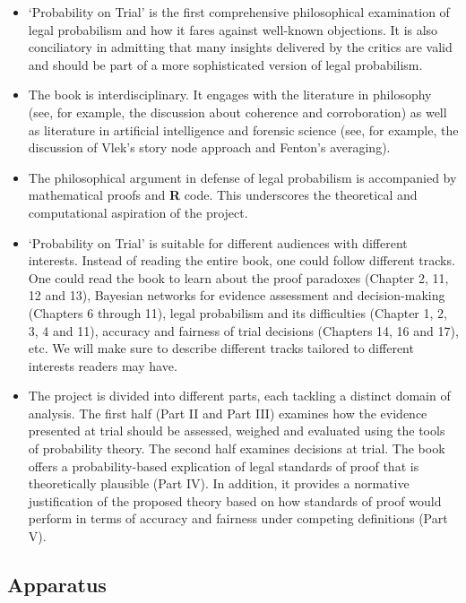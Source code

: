 \documentclass[
  10pt,
  dvipsnames,enabledeprecatedfontcommands]{scrartcl}
\begin{document}
\begin{itemize}
\item
  `Probability on Trial' is the first comprehensive philosophical
  examination of legal probabilism and how it fares against well-known
  objections. It is also conciliatory in admitting that many insights
  delivered by the critics are valid and should be part of a more
  sophisticated version of legal probabilism.
\item
  The book is interdisciplinary. It engages with the literature in
  philosophy (see, for example, the discussion about coherence and
  corroboration) as well as literature in artificial intelligence and
  forensic science (see, for example, the discussion of Vlek's story
  node approach and Fenton's averaging).
\item
  The philosophical argument in defense of legal probabilism is
  accompanied by mathematical proofs and \textbf{\textsf{R}} code. This
  underscores the theoretical and computational aspiration of the
  project.
\item
  `Probability on Trial' is suitable for different audiences with
  different interests. Instead of reading the entire book, one could
  follow different tracks. One could read the book to learn about the
  proof paradoxes (Chapter 2, 11, 12 and 13), Bayesian networks for
  evidence assessment and decision-making (Chapters 6 through 11), legal
  probabilism and its difficulties (Chapter 1, 2, 3, 4 and 11), accuracy
  and fairness of trial decisions (Chapters 14, 16 and 17), etc. We will
  make sure to describe different tracks tailored to different interests
  readers may have.
\item
  The project is divided into different parts, each tackling a distinct
  domain of analysis. The first half (Part II and Part III) examines how
  the evidence presented at trial should be assessed, weighed and
  evaluated using the tools of probability theory. The second half
  examines decisions at trial. The book offers a probability-based
  explication of legal standards of proof that is theoretically
  plausible (Part IV). In addition, it provides a normative
  justification of the proposed theory based on how standards of proof
  would perform in terms of accuracy and fairness under competing
  definitions (Part V).
\end{itemize}

\hypertarget{apparatus}{%
\subsection{Apparatus}\label{apparatus}}
\end{document}
